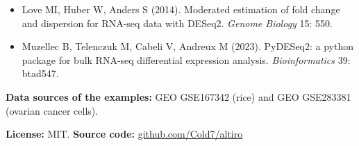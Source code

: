 \documentclass[11pt,a4paper]{article}
\begin{document}
\begin{itemize}
  \item Love MI, Huber W, Anders S (2014). Moderated estimation of fold change and dispersion for RNA-seq
        data with DESeq2. \emph{Genome Biology} 15: 550.
  \item Muzellec B, Telenczuk M, Cabeli V, Andreux M (2023). PyDESeq2: a python package for bulk RNA-seq
        differential expression analysis. \emph{Bioinformatics} 39: btad547.
\end{itemize}

\textbf{Data sources of the examples:} GEO GSE167342 (rice) and GEO GSE283381 (ovarian cancer cells).

\textbf{License:} MIT. \quad \textbf{Source code:}
\href{https://github.com/Cold7/altiro}{github.com/Cold7/altiro}
\end{document}
